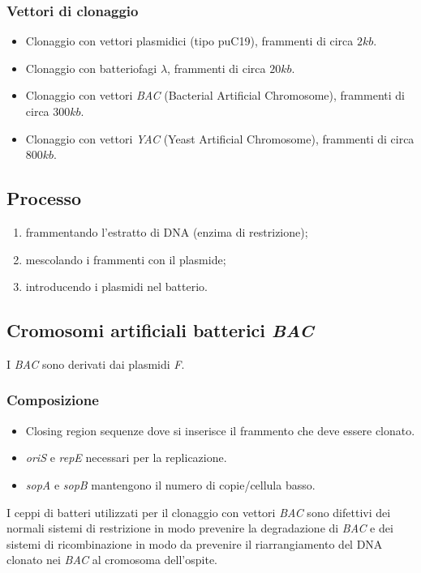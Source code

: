 		\subsubsection{Vettori di clonaggio}
		\begin{multicols}{2}
			\begin{itemize}
    				\item Clonaggio con vettori plasmidici (tipo puC19), frammenti di circa $2kb$.
    				\item Clonaggio con batteriofagi $\lambda$, frammenti di circa $20 kb$.
				\item Clonaggio con vettori \emph{BAC} (Bacterial Artificial Chromosome), frammenti di circa $300 kb$. 
				\item Clonaggio con vettori \emph{YAC} (Yeast Artificial Chromosome), frammenti di circa $800 kb$.
			\end{itemize}
		\end{multicols}


	\subsection{Processo}
	\begin{enumerate}
    		\item frammentando l'estratto di DNA (enzima di restrizione); 
    		\item mescolando i frammenti con il plasmide; 
    		\item introducendo i plasmidi nel batterio.
	\end{enumerate}

	\subsection{Cromosomi artificiali batterici \emph{BAC}}
	I \emph{BAC} sono derivati dai plasmidi \emph{F}. 

		\subsubsection{Composizione}
		\begin{multicols}{2}
			\begin{itemize}
    				\item Closing region sequenze dove si inserisce il frammento che deve essere clonato.
				\item \emph{oriS} e \emph{repE} necessari per la replicazione.
				\item \emph{sopA} e \emph{sopB} mantengono il numero di copie/cellula basso.
			\end{itemize}
		\end{multicols}
		I ceppi di batteri utilizzati per il clonaggio con vettori \emph{BAC} sono difettivi dei normali sistemi di restrizione in modo prevenire la degradazione di \emph{BAC} e dei sistemi di ricombinazione in modo da prevenire il riarrangiamento del DNA clonato nei \emph{BAC} al cromosoma dell'ospite.

